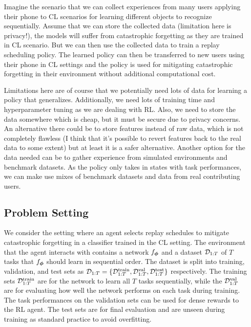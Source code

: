 
Imagine the scenario that we can collect experiences from many users applying their phone to CL scenarios for learning different objects to recognize sequentially. Assume that we can store the collected data (limitation here is privacy!), the models will suffer from catastrophic forgetting as they are trained in CL scenario. But we can then use the collected data to train a replay scheduling policy. The learned policy can then be transferred to new users using their phone in CL settings and the policy is used for mitigating catastrophic forgetting in their environment without additional computational cost. 

Limitations here are of course that we potentially need lots of data for learning a policy that generalizes. Additionally, we need lots of training time and hyperparameter tuning as we are dealing with RL. Also, we need to store the data somewhere which is cheap, but it must be secure due to privacy concerns. An alternative there could be to store features instead of raw data, which is not completely flawless (I think that it's possible to revert features back to the real data to some extent) but at least it is a safer alternative. Another option for the data needed can be to gather experience from simulated environments and benchmark datasets. As the policy only takes in states with task performances, we can make use mixes of benchmark datasets and data from real contributing users. 

  
\subsection{Problem Setting}

We consider the setting where an agent selects replay schedules to mitigate catastrophic forgetting in a classifier trained in the CL setting. The environment that the agent interacts with contains a network $f_{{\bm{\phi}}}$ and a dataset ${\mathcal{D}}_{1:T}$ of $T$ tasks that $f_{{\bm{\phi}}}$ should learn in sequential order. The dataset is split into training, validation, and test sets as ${\mathcal{D}}_{1:T} = \{{\mathcal{D}}_{1:T}^{{\text{train}}}, {\mathcal{D}}_{1:T}^{{\text{val}}}, {\mathcal{D}}_{1:T}^{{\text{test}}}\}$ respectively. The training sets ${\mathcal{D}}_{1:T}^{{\text{train}}}$ are for the network to learn all $T$ tasks sequentially, while the ${\mathcal{D}}_{1:T}^{{\text{val}}}$ are for evaluating how well the network performs on each task during training. The task performances on the validation sets can be used for dense rewards to the RL agent. The test sets are for final evaluation and are unseen during training as standard practice to avoid overfitting.  

